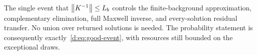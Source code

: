 The single event that $\left\lVert K^{-1}\right\rVert\le L_b$ controls the finite-background approximation, complementary elimination, full Maxwell inverse, and every-solution residual transfer. No union over returned solutions is needed. The probability statement is consequently exactly~\eqref{d:eq:good-event}, with resources still bounded on the exceptional draws.
